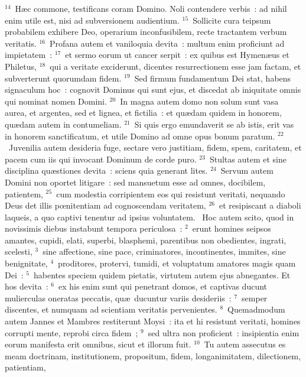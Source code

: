 ${}^{14}$~H\ae c commone, testificans coram Domino. Noli contendere verbis~: ad nihil enim utile est, nisi ad subversionem audientium.
${}^{15}$~Sollicite cura teipsum probabilem exhibere Deo, operarium inconfusibilem, recte tractantem verbum veritatis.
${}^{16}$~Profana autem et vaniloquia devita~: multum enim proficiunt ad impietatem~:
${}^{17}$~et sermo eorum ut cancer serpit~: ex quibus est Hymen\ae us et Philetus,
${}^{18}$~qui a veritate exciderunt, dicentes resurrectionem esse jam factam, et subverterunt quorumdam fidem.
${}^{19}$~Sed firmum fundamentum Dei stat, habens signaculum hoc~: cognovit Dominus qui sunt ejus, et discedat ab iniquitate omnis qui nominat nomen Domini.
${}^{20}$~In magna autem domo non solum sunt vasa aurea, et argentea, sed et lignea, et fictilia~: et qu\ae dam quidem in honorem, qu\ae dam autem in contumeliam.
${}^{21}$~Si quis ergo emundaverit se ab istis, erit vas in honorem sanctificatum, et utile Domino ad omne opus bonum paratum.
${}^{22}$~Juvenilia autem desideria fuge, sectare vero justitiam, fidem, spem, caritatem, et pacem cum iis qui invocant Dominum de corde puro.
${}^{23}$~Stultas autem et sine disciplina qu\ae stiones devita~: sciens quia generant lites.
${}^{24}$~Servum autem Domini non oportet litigare~: sed mansuetum esse ad omnes, docibilem, patientem,
${}^{25}$~cum modestia corripientem eos qui resistunt veritati, nequando Deus det illis pœnitentiam ad cognoscendam veritatem,
${}^{26}$~et resipiscant a diaboli laqueis, a quo captivi tenentur ad ipsius voluntatem.
~Hoc autem scito, quod in novissimis diebus instabunt tempora periculosa~:
${}^{2}$~erunt homines seipsos amantes, cupidi, elati, superbi, blasphemi, parentibus non obedientes, ingrati, scelesti,
${}^{3}$~sine affectione, sine pace, criminatores, incontinentes, immites, sine benignitate,
${}^{4}$~proditores, protervi, tumidi, et voluptatum amatores magis quam Dei~:
${}^{5}$~habentes speciem quidem pietatis, virtutem autem ejus abnegantes. Et hos devita~:
${}^{6}$~ex his enim sunt qui penetrant domos, et captivas ducunt mulierculas oneratas peccatis, qu\ae\ ducuntur variis desideriis~:
${}^{7}$~semper discentes, et numquam ad scientiam veritatis pervenientes.
${}^{8}$~Quemadmodum autem Jannes et Mambres restiterunt Moysi~: ita et hi resistunt veritati, homines corrupti mente, reprobi circa fidem~;
${}^{9}$~sed ultra non proficient~: insipientia enim eorum manifesta erit omnibus, sicut et illorum fuit.
${}^{10}$~Tu autem assecutus es meam doctrinam, institutionem, propositum, fidem, longanimitatem, dilectionem, patientiam,
